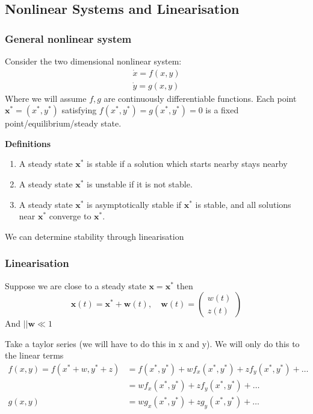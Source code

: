 \documentclass{/home/janmebows/Documents/LatexTemplates/myassignment}
\begin{document}
\subsection{Nonlinear Systems and Linearisation}
\subsubsection{General nonlinear system}
Consider the two dimensional nonlinear system:
\begin{align*}
    \dot x = f(x,y)\\
    \dot y = g(x,y)
\end{align*}
Where we will assume  $f,g$ are continuously differentiable functions.
Each point $\mathbf{x}^* = (x^*,y^*)$ satisfying $f(x^*,y^*) = g(x^*,y^*) = 0$ is a fixed point/equilibrium/steady state.

\textbf{Definitions}
\begin{enumerate}
\item A steady state $\mathbf{x}^*$ is stable if a solution which starts nearby stays nearby
\item A steady state $\mathbf{x}^*$ is unstable if it is not stable.
\item A steady state $\mathbf{x}^*$ is asymptotically stable if $\mathbf{x}^*$ is stable, and all solutions near $\mathbf{x}^*$ converge to $\mathbf{x}^*$.
\end{enumerate} 
We can determine stability through linearisation

\subsubsection{Linearisation}
Suppose we are close to a steady state $\mathbf{x} = \mathbf{x^*}$ then
\[\mathbf{x}(t) = \mathbf{x^*} + \mathbf{w}(t), \quad \mathbf{w}(t) = \begin{pmatrix}
w(t)\\z(t)
\end{pmatrix}\]
And $||\mathbf{w}\ll 1$


Take a taylor series (we will have to do this in x and y). We will only do this to the linear terms
\begin{align*}
    f(x,y) = f(x^*+w,y^*+z) &= f(x^*,y^*) + w f_x(x^*,y^*) + zf_y(x^*,y^*) + \ldots\\
    &= w f_x(x^*,y^*) + zf_y(x^*,y^*) + \ldots\\
    g(x,y) &= wg_x(x^*,y^*) + zg_y(x^*,y^*) + \ldots
\end{align*}
\end{document}
